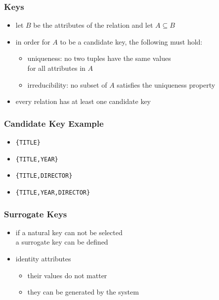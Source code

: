 \documentclass[dvipsnames]{beamer}
\theoremstyle{plain}
\begin{document}
\begin{frame}
  \frametitle{Keys}

  \begin{itemize}
    \item let $B$ be the attributes of the relation and let $A \subseteq B$

    \item in order for $A$ to be a candidate key, the following must hold:

    \pause
    \begin{itemize}
      \item \alert{uniqueness}: no two tuples have the same values\\
        for all attributes in $A$

      \pause
      \item \alert{irreducibility}: no subset of $A$ satisfies the uniqueness
        property
    \end{itemize}

    \pause
    \item every relation has at least one candidate key
  \end{itemize}
\end{frame}

\begin{frame}
  \frametitle{Candidate Key Example}

  \begin{example}
    \begin{itemize}
      \item \texttt{\{TITLE\}}

      \pause
      \item \texttt{\{TITLE,YEAR\}}

      \pause
      \item \texttt{\{TITLE,DIRECTOR\}}

      \pause
      \item \texttt{\{TITLE,YEAR,DIRECTOR\}}
    \end{itemize}
  \end{example}
\end{frame}

\begin{frame}
  \frametitle{Surrogate Keys}

  \begin{itemize}
    \item if a \alert{natural key} can not be selected\\
      a \alert{surrogate key} can be defined

    \pause
    \medskip
    \item identity attributes
    \begin{itemize}
      \item their values do not matter
      \item they can be generated by the system
    \end{itemize}
  \end{itemize}
\end{frame}
\end{document}
